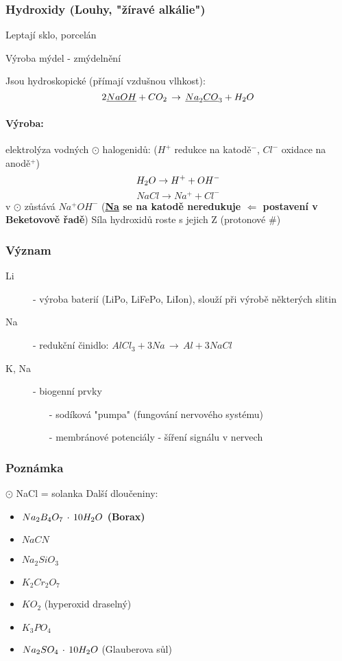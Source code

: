     \newpage
    \subsubsection{Hydroxidy (Louhy, "žíravé alkálie")}
        Leptají sklo, porcelán

        Výroba mýdel - zmýdelnění

        Jsou hydroskopické (přímají vzdušnou vlhkost):\[2\underline{NaOH} + CO_2\,\to\,\underline{Na}_2\underline{CO}_3 + H_2O \]
        \paragraph*{Výroba:}
            elektrolýza vodných $\odot$ halogenidů: ($H^+$ redukce na katodě$^-$, $Cl^-$ oxidace na anodě$^+$)
            \[H_2O \to H ^+ + OH^-\]
            \[NaCl \to Na^+ + Cl^-\]
            v $\odot$ zůstává $Na^+OH^-$ (\textbf{\underline{Na} se na katodě neredukuje $\Longleftarrow $ postavení v Beketovově řadě})
            Síla hydroxidů roste s jejich Z (protonové \#)
    \subsubsection{Význam}
        \begin{description}
            \item[Li] - výroba baterií (LiPo, LiFePo, LiIon), slouží při výrobě některých slitin
            \item[Na] - redukční činidlo: \(AlCl_3 + 3Na\,\to\,Al+3NaCl\)
            \item[K, Na] - biogenní prvky \begin{itemize}
                \item[-] sodíková "pumpa" (fungování nervového systému)
                \item[-] membránové potenciály - šíření signálu v nervech
            \end{itemize}
        \end{description}
    \subsubsection{Poznámka}
    $\odot$ NaCl = solanka
    \newline
    \newline
    Další dloučeniny:
    \begin{itemize}
        \item \textbf{$ Na _2 B _4 O _7 \, \cdot \, 10 H_2O$ (Borax)}
        \item $NaCN$
        \item $Na_2SiO_3$
        \item $K _2 Cr _2 O _7$
        \item $K O _2$ (hyperoxid draselný)
        \item $K _3 P O _4$
        \item $Na _2 SO _4 \, \cdot \, 10 H_2O$ (Glauberova sůl)
    \end{itemize}

